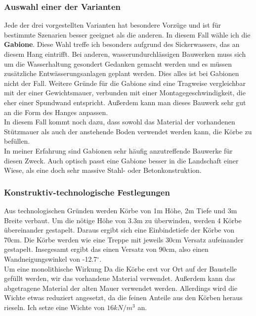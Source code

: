 \documentclass[11pt,fleqn,a4paper,halfparskip]{article}
\begin{document}
\subsubsection*{Auswahl einer der Varianten}
Jede der drei vorgestellten Varianten hat besondere Vorzüge und ist für bestimmte Szenarien besser geeignet als die anderen. In diesem Fall wähle ich die \textbf{Gabione}. Diese Wahl treffe ich besonders aufgrund des Sickerwassers, das an diesem Hang eintrifft. Bei anderen, wasserundurchlässigen Bauwerken muss sich um die Wasserhaltung gesondert Gedanken gemacht werden und es müssen zusätzliche Entwässerungsanlagen geplant werden. Dies alles ist bei Gabionen nicht der Fall. Weitere Gründe für die Gabione sind eine Tragweise vergleichbar mit der einer Gewichtsmauer, verbunden mit einer Montagegeschwindigkeit, die eher einer Spundwand entspricht. Außerdem kann man dieses Bauwerk sehr gut an die Form des Hanges anpassen. \\
In diesem Fall kommt noch dazu, dass sowohl das Material der vorhandenen Stützmauer als auch der anstehende Boden verwendet werden kann, die Körbe zu befüllen. \\
In meiner Erfahrung sind Gabionen sehr häufig anzutreffende Bauwerke für diesen Zweck. Auch optisch passt eine Gabione besser in die Landschaft einer Wiese, als eine doch sehr massive Stahl- oder Betonkonstruktion.
\subsubsection*{Konstruktiv-technologische Festlegungen}
Aus technologischen Gründen werden Körbe von 1m Höhe, 2m Tiefe und 3m Breite verbaut. Um die nötige Höhe von 3.3m zu überwinden, werden 4 Körbe übereinander gestapelt. Daraus ergibt sich eine Einbindetiefe der Körbe von 70cm. Die Körbe werden wie eine Treppe mit jeweils 30cm Versatz aufeinander gestapelt. Insegesamt ergibt das einen Versatz von 90cm, also einen Wandneigungswinkel von -12.7$^\circ$.\\
Um eine monolithische Wirkung 
Da die Körbe erst vor Ort auf der Baustelle gefüllt werden, wir das vorhandene Material verwendet. Außerdem kann das abgetragene Material der alten Mauer verwendet werden. Allerdings wird die Wichte etwas reduziert angesetzt, da die feinen Anteile aus den Körben heraus rieseln. Ich setze eine Wichte von $16kN/m^3$ an. 
\newpage
\end{document}
